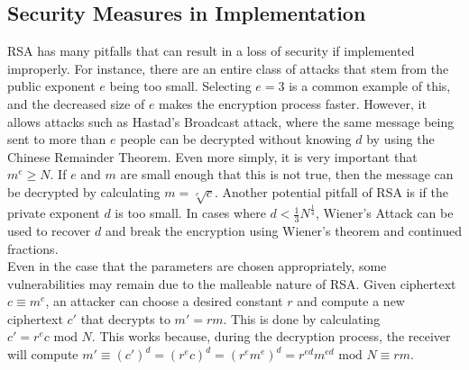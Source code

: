 	\subsection{Security Measures in Implementation}\label{sec:rsa-security}
		RSA has many pitfalls that can result in a loss of security if implemented improperly. For instance, there are an entire class of attacks that stem from the public exponent $e$ being
		too small. Selecting $e=3$ is a common example of this, and the decreased size of $e$ makes the encryption process faster. However, it allows attacks such as Hastad's Broadcast attack,
		where the same message being sent to more than $e$ people can be decrypted without knowing $d$ by using the Chinese Remainder Theorem. Even more simply, it is very important that
		$m^e\ge N$. If $e$ and $m$ are small enough that this is not true, then the message can be decrypted by calculating $m=\sqrt[e]c$. Another potential pitfall of RSA is if the private 
		exponent $d$ is too small. In cases where $d < \frac13N^{\frac14}$, Wiener's Attack can be used to recover $d$ and break the encryption using Wiener's theorem and continued fractions.\\

		Even in the case that the parameters are chosen appropriately, some vulnerabilities may remain due to the malleable nature of RSA. Given ciphertext $c\equiv m^e$, an attacker can choose
		a desired constant $r$ and compute a new ciphertext $c'$ that decrypts to $m'=rm$. This is done by calculating $c'=r^ec\text{ mod }N$. This works because, during the decryption process,
		the receiver will compute $m'\equiv (c')^d=(r^ec)^d=(r^em^e)^d=r^{ed}m^{ed}\text{ mod }N\equiv rm$.\\

